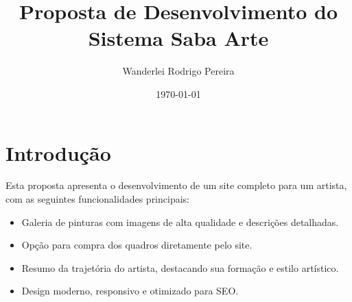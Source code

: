 \documentclass[a4paper,12pt]{article}
\title{Proposta de Desenvolvimento do Sistema Saba Arte}
\author{Wanderlei Rodrigo Pereira}
\date{\today}
\begin{document}
\maketitle

\section*{Introdução}
Esta proposta apresenta o desenvolvimento de um site completo para um artista, com as seguintes funcionalidades principais: 
\begin{itemize}
    \item Galeria de pinturas com imagens de alta qualidade e descrições detalhadas.
    \item Opção para compra dos quadros diretamente pelo site.
    \item Resumo da trajetória do artista, destacando sua formação e estilo artístico.
    \item Design moderno, responsivo e otimizado para SEO.
\end{itemize}
\end{document}
